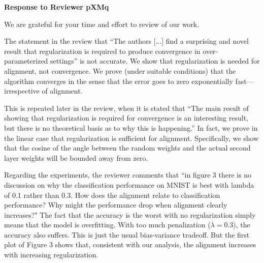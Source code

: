 
{\bf Response to Reviewer pXMq}

We are grateful for your time and effort to review of our work.

The statement in the review that
``The authors [...] find a surprising and novel result that regularization is required to produce convergence in over-parameterized settings'' is not accurate.
We show that regularization is needed for alignment, not convergence. We prove (under suitable conditions) that the algorithm converges in the sense that the error goes to zero exponentially fast---irrespective of alignment.

This is repeated later in the review, when it is stated that
``The main result of showing that regularization is required for convergence is an interesting result, but there is no theoretical basis as to why this is happening.'' In fact, we prove in the linear case that regularization is sufficient for alignment.
Specifically, we show that the cosine of the angle between the random weights and the actual second layer weights will be bounded away from zero.

Regarding the experiments, the reviewer comments that ``in figure 3 there is no discussion on why the classification performance on MNIST is best with lambda of 0.1 rather than 0.3. How does the alignment relate to classification performance? Why might the performance drop when alignment clearly increases?"
The fact that the accuracy is the worst with no regularization simply means that the model is overfitting. With too much penalization ($\lambda = 0.3$), the accuracy also suffers. This is just the usual bias-variance tradeoff. But the first plot of Figure 3 shows that, consistent with our analysis, the alignment {increases} with increasing regularization.


\clearpage


